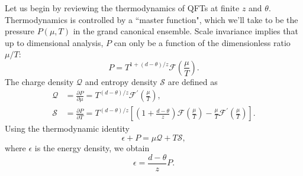 \documentclass[10pt, oneside]{book}
\begin{document}
\begin{doublespace}
 Let us begin by reviewing the thermodynamics of QFTs at finite $z$ and $\theta$.   Thermodynamics is controlled by a ``master function", which we'll take to be the pressure $P(\mu,T)$ in the grand canonical ensemble.   Scale invariance implies that up to dimensional analysis, $P$ can only be a function of the dimensionless ratio $\mu/T$: 
 \begin{equation}
P = T^{1+(d-\theta)/z} \mathcal{F}\left(\frac{\mu}{T}\right).  \label{eq:PTmu}
\end{equation}
The charge density $\mathcal{Q}$ and entropy density $\mathcal{S}$ are defined as \begin{subequations}\begin{align}
\mathcal{Q} &= \frac{\partial P}{\partial \mu} = T^{(d-\theta)/z} \mathcal{F}^\prime \left(\frac{\mu}{T}\right), \\
\mathcal{S} &= \frac{\partial P}{\partial T} = T^{(d-\theta)/z}\left[ \left(1+\frac{d-\theta}{z}\right)\mathcal{F} \left(\frac{\mu}{T}\right)- \frac{\mu}{T}\mathcal{F}^\prime \left(\frac{\mu}{T}\right)\right].
\end{align}\end{subequations}
Using the thermodynamic identity 
\begin{equation}
\epsilon+P = \mu \mathcal{Q} + T\mathcal{S},  \label{eq:gibbsduhem}
\end{equation}
where $\epsilon$ is the energy density, 
we obtain 
\begin{equation}
\epsilon = \frac{d-\theta}{z}P.   \label{eq:epsandP}
\end{equation}


\end{doublespace}
\end{document}
